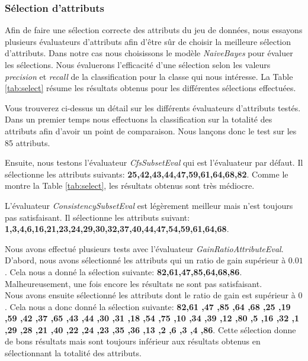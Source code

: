 \documentclass[10pt,a4paper]{article}
\begin{document}
			\subsubsection*{Sélection d'attributs}
			
				Afin de faire une sélection correcte des attributs du jeu de données, nous essayons plusieurs évaluateurs d'attributs afin d'être sûr de choisir la meilleure sélection d'attributs. Dans notre cas nous choisissons le modèle \textit{NaiveBayes} pour évaluer les sélections. Nous évaluerons l'efficacité d'une sélection selon les valeurs \textit{precision} et \textit{recall} de la classification pour la classe qui nous intéresse. La Table \ref{tab:select} résume les résultats obtenus pour les différentes sélections effectuées.
				
				Vous trouverez ci-dessus un détail sur les différents évaluateurs d'attributs testés. 
				\\
				
				Dans un premier temps nous effectuons la classification sur la totalité des attributs afin d'avoir un point de comparaison. Nous lançons donc le test sur les 85 attributs.
				
				Ensuite, nous testons l'évaluateur \textit{CfsSubsetEval} qui est l'évaluateur par défaut. Il sélectionne les attributs suivants: \textbf{25,42,43,44,47,59,61,64,68,82}. Comme le montre la Table \ref{tab:select}, les résultats obtenus sont très médiocre.
				
				L'évaluateur \textit{ConsistencySubsetEval} est légèrement meilleur mais n'est toujours pas satisfaisant. Il sélectionne les attributs suivant: \textbf{1,3,4,6,16,21,23,24,29,30,32,37,40,44,47,54,59,61,64,68}.
				
				Nous avons effectué plusieurs tests avec l'évaluateur \textit{GainRatioAttributeEval}. D'abord, nous avons sélectionné les attributs qui un ratio de gain supérieur à $0.01$. Cela nous a donné la sélection suivante: \textbf{82,61,47,85,64,68,86}. Malheureusement, une fois encore les résultats ne sont pas satisfaisant.\\
				Nous avons ensuite sélectionné les attributs dont le ratio de gain est supérieur à $0$. Cela nous a donc donné la sélection suivante: \textbf{82,61 ,47 ,85 ,64 ,68 ,25 ,19 ,59 ,42 ,37 ,65 ,43 ,44 ,30 ,31 ,18 ,54 ,75 ,10 ,34 ,39 ,12 ,80 ,5 ,16 ,32 ,1 ,29 ,28 ,21 ,40 ,22 ,24 ,23 ,35 ,36 ,13 ,2 ,6 ,3 ,4 ,86}. Cette sélection donne de bons résultats mais sont toujours inférieur aux résultats obtenus en sélectionnant la totalité des attributs.
				
\end{document}
